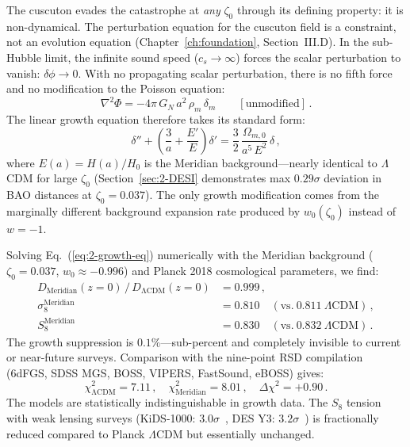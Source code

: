 The cuscuton evades the catastrophe at \emph{any} $\zeta_0$ through its defining property: it is non-dynamical. The perturbation equation for the cuscuton field is a constraint, not an evolution equation (Chapter~\ref{ch:foundation}, Section~III.D). In the sub-Hubble limit, the infinite sound speed ($c_s \to \infty$) forces the scalar perturbation to vanish: $\delta\phi \to 0$. With no propagating scalar perturbation, there is no fifth force and no modification to the Poisson equation:
\begin{equation}
\nabla^2\Phi = -4\pi\,G_N\,a^2\,\rho_m\,\delta_m \qquad [\text{unmodified}]\,.
\label{eq:2-Poisson}
\end{equation}
The linear growth equation therefore takes its standard form:
\begin{equation}
\delta'' + \left(\frac{3}{a} + \frac{E'}{E}\right)\delta' = \frac{3}{2}\,\frac{\Omega_{m,0}}{a^5\,E^2}\,\delta\,,
\label{eq:2-growth-eq}
\end{equation}
where $E(a) = H(a)/H_0$ is the Meridian background---nearly identical to $\Lambda$CDM for large $\zeta_0$ (Section~\ref{sec:2-DESI} demonstrates max $0.29\sigma$ deviation in BAO distances at $\zeta_0 = 0.037$). The only growth modification comes from the marginally different background expansion rate produced by $w_0(\zeta_0)$ instead of $w = -1$.

Solving Eq.~(\ref{eq:2-growth-eq}) numerically with the Meridian background ($\zeta_0 = 0.037$, $w_0 \approx -0.996$) and Planck 2018 cosmological parameters, we find:
\begin{align}
D_\mathrm{Meridian}(z=0)\,/\,D_\mathrm{\Lambda CDM}(z=0) &= 0.999\,,
\label{eq:2-growth-ratio} \\
\sigma_8^\mathrm{Meridian} &= 0.810 \quad (\text{vs.}\ 0.811\ \Lambda\text{CDM})\,,
\label{eq:2-sigma8} \\
S_8^\mathrm{Meridian} &= 0.830 \quad (\text{vs.}\ 0.832\ \Lambda\text{CDM})\,.
\label{eq:2-S8}
\end{align}
The growth suppression is $0.1\%$---sub-percent and completely invisible to current or near-future surveys. Comparison with the nine-point RSD compilation (6dFGS, SDSS MGS, BOSS, VIPERS, FastSound, eBOSS) gives:
\begin{equation}
\chi^2_\mathrm{\Lambda CDM} = 7.11\,,\quad \chi^2_\mathrm{Meridian} = 8.01\,,\quad \Delta\chi^2 = +0.90\,.
\label{eq:2-RSD}
\end{equation}
The models are statistically indistinguishable in growth data. The $S_8$ tension with weak lensing surveys (KiDS-1000: $3.0\sigma$~\cite{ch2:KiDS2021}, DES Y3: $3.2\sigma$~\cite{ch2:DES2022}) is fractionally reduced compared to Planck $\Lambda$CDM but essentially unchanged.

